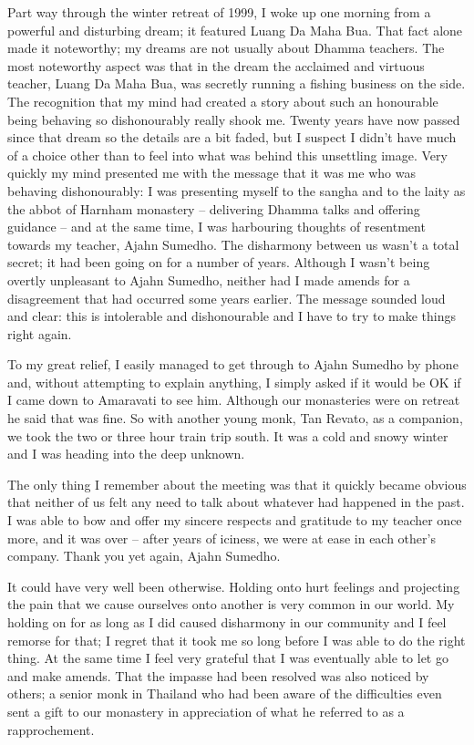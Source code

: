 Part way through the winter retreat of 1999, I woke up one morning from
a powerful and disturbing dream; it featured Luang Da Maha Bua. That
fact alone made it noteworthy; my dreams are not usually about Dhamma
teachers. The most noteworthy aspect was that in the dream the acclaimed
and virtuous teacher, Luang Da Maha Bua, was secretly running a fishing
business on the side. The recognition that my mind had created a story
about such an honourable being behaving so dishonourably really shook
me. Twenty years have now passed since that dream so the details are a
bit faded, but I suspect I didn't have much of a choice other than to
feel into what was behind this unsettling image. Very quickly my mind
presented me with the message that it was me who was behaving
dishonourably: I was presenting myself to the sangha and to the laity as
the abbot of Harnham monastery -- delivering Dhamma talks and offering
guidance -- and at the same time, I was harbouring thoughts of
resentment towards my teacher, Ajahn Sumedho. The disharmony between us
wasn't a total secret; it had been going on for a number of years.
Although I wasn't being overtly unpleasant to Ajahn Sumedho, neither had
I made amends for a disagreement that had occurred some years earlier.
The message sounded loud and clear: this is intolerable and
dishonourable and I have to try to make things right again.

To my great relief, I easily managed to get through to Ajahn Sumedho by
phone and, without attempting to explain anything, I simply asked if it
would be OK if I came down to Amaravati to see him. Although our
monasteries were on retreat he said that was fine. So with another young
monk, Tan Revato, as a companion, we took the two or three hour train
trip south. It was a cold and snowy winter and I was heading into the
deep unknown.

The only thing I remember about the meeting was that it quickly became
obvious that neither of us felt any need to talk about whatever had
happened in the past. I was able to bow and offer my sincere respects
and gratitude to my teacher once more, and it was over -- after years of
iciness, we were at ease in each other's company. Thank you yet again,
Ajahn Sumedho.

It could have very well been otherwise. Holding onto hurt feelings and
projecting the pain that we cause ourselves onto another is very common
in our world. My holding on for as long as I did caused disharmony in
our community and I feel remorse for that; I regret that it took me so
long before I was able to do the right thing. At the same time I feel
very grateful that I was eventually able to let go and make amends. That
the impasse had been resolved was also noticed by others; a senior monk
in Thailand who had been aware of the difficulties even sent a gift to
our monastery in appreciation of what he referred to as a rapprochement.

